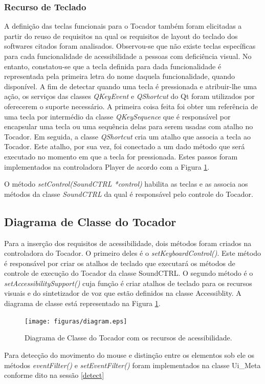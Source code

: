 \subsubsection{Recurso de Teclado}

A definição das teclas funcionais para o Tocador também foram elicitadas a partir do reuso de requisitos na qual os requisitos de layout do teclado dos softwares citados foram analisados. Observou-se que não existe teclas específicas para cada funcionalidade de acessibilidade a pessoas com deficiência visual. No entanto, constatou-se que a tecla definida para dada funcionalidade é representada pela primeira letra do nome daquela funcionalidade, quando disponível. A fim de detectar quando uma tecla é pressionada e atribuir-lhe uma ação, os serviços das classes \textit{QKeyEvent} e \textit{QShortcut} do Qt foram utilizados por oferecerem o suporte necessário. A primeira coisa feita foi obter um referência de uma tecla por intermédio da classe \textit{QKeySequence} que é responsável por encapsular uma tecla ou uma sequência delas para serem usadas com atalho no Tocador. Em seguida, a classe \textit{QShortcut} cria um atalho que associa a tecla ao Tocador. Este atalho, por sua vez, foi conectado a um dado método que será executado no momento em que a tecla for pressionada. Estes passos foram implementados na controladora Player de acordo com a Figura \ref{diagram}.

O método \textit{setControl(SoundCTRL *control)} habilita as teclas e as associa aos métodos da classe \textit{SoundCTRL} da qual é responsável pelo controle do Tocador.

\subsection{Diagrama de Classe do Tocador}

Para a inserção dos requisitos de acessibilidade, dois métodos foram criados na controladora do Tocador. O primeiro deles é o \textit{setKeyboardControl()}. Este método é responsável por criar os atalhos de teclado que executará os métodos de controle de execução do Tocador da classe SoundCTRL. O segundo método é o \textit{setAccessibilitySupport()} cuja função é criar atalhos de teclado para os recursos visuais e do sintetizador de voz que estão definidos na classe Accessiblity. A diagrama de classe está representado na Figura \ref{diagram}.

\begin{figure}[ht]
	\centering
		\texttt{[image: figuras/diagram.eps]}
	\caption{Diagrama de Classe do Tocador com os recursos de acessibilidade.}
	\label{diagram}
\end{figure}

Para detecção do movimento do mouse e distinção entre os elementos sob ele os métodos \textit{eventFilter()} e \textit{setEventFilter()} foram implementados na classe Ui\_Meta conforme dito na sessão \ref{detect}


